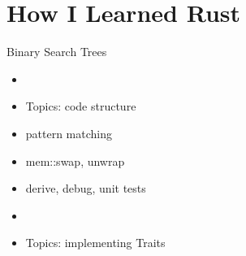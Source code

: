 \section{How I Learned Rust}


\begin{frame}{Binary Search Trees}
	\begin{itemize}
		\item \href{https://github.com/mspiegel/rust-yaar/blob/master/src/llredblack/mod.rs}{\color{red}{Left-leaning red-black trees}}
		\item Topics: code structure
		\item pattern matching
		\item mem::swap, unwrap
		\item derive, debug, unit tests
		\item \href{https://github.com/mspiegel/rust-yaar/blob/master/src/bplus/mod.rs}{\color{red}{B+ trees}}
		\item Topics: implementing Traits
	\end{itemize}
\end{frame}

